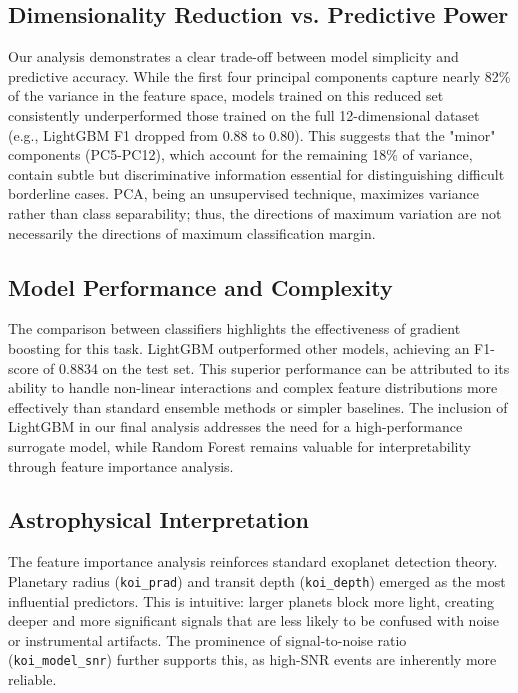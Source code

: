 \subsection{Dimensionality Reduction vs. Predictive Power}
Our analysis demonstrates a clear trade-off between model simplicity and predictive accuracy. While the first four principal components capture nearly 82\% of the variance in the feature space, models trained on this reduced set consistently underperformed those trained on the full 12-dimensional dataset (e.g., LightGBM F1 dropped from 0.88 to 0.80). This suggests that the "minor" components (PC5-PC12), which account for the remaining 18\% of variance, contain subtle but discriminative information essential for distinguishing difficult borderline cases. PCA, being an unsupervised technique, maximizes variance rather than class separability; thus, the directions of maximum variation are not necessarily the directions of maximum classification margin.

\subsection{Model Performance and Complexity}
The comparison between classifiers highlights the effectiveness of gradient boosting for this task. LightGBM outperformed other models, achieving an F1-score of 0.8834 on the test set. This superior performance can be attributed to its ability to handle non-linear interactions and complex feature distributions more effectively than standard ensemble methods or simpler baselines. The inclusion of LightGBM in our final analysis addresses the need for a high-performance surrogate model, while Random Forest remains valuable for interpretability through feature importance analysis.

\subsection{Astrophysical Interpretation}
The feature importance analysis reinforces standard exoplanet detection theory. Planetary radius (\texttt{koi\_prad}) and transit depth (\texttt{koi\_depth}) emerged as the most influential predictors. This is intuitive: larger planets block more light, creating deeper and more significant signals that are less likely to be confused with noise or instrumental artifacts. The prominence of signal-to-noise ratio (\texttt{koi\_model\_snr}) further supports this, as high-SNR events are inherently more reliable.

